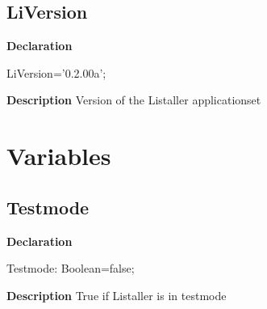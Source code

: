 \documentclass{report}
\newif\ifpdf
\begin{document}
\subsection*{LiVersion}
\fi
\label{utilities-LiVersion}
\begin{list}{}{
\setlength{\itemindent}{0cm}
\setlength{\listparindent}{0cm}
\setlength{\leftmargin}{\evensidemargin}
\addtolength{\leftmargin}{\tmplength}
\settowidth{\labelsep}{X}
\addtolength{\leftmargin}{\labelsep}
\setlength{\labelwidth}{\tmplength}
}
\item[\textbf{Declaration}\hfill]
\ifpdf
\begin{flushleft}
\fi
\begin{ttfamily}
LiVersion='0.2.00a';\end{ttfamily}

\ifpdf
\end{flushleft}
\fi

\par
\item[\textbf{Description}]
Version of the Listaller applicationset

\end{list}
\section{Variables}
\ifpdf
\subsection*{\large{\textbf{Testmode}}\normalsize\hspace{1ex}\hrulefill}
\else
\subsection*{Testmode}
\fi
\label{utilities-Testmode}
\begin{list}{}{
\setlength{\itemindent}{0cm}
\setlength{\listparindent}{0cm}
\setlength{\leftmargin}{\evensidemargin}
\addtolength{\leftmargin}{\tmplength}
\settowidth{\labelsep}{X}
\addtolength{\leftmargin}{\labelsep}
\setlength{\labelwidth}{\tmplength}
}
\item[\textbf{Declaration}\hfill]
\ifpdf
\begin{flushleft}
\fi
\begin{ttfamily}
Testmode: Boolean=false;\end{ttfamily}

\ifpdf
\end{flushleft}
\fi

\par
\item[\textbf{Description}]
True if Listaller is in testmode

\end{list}
\end{document}
